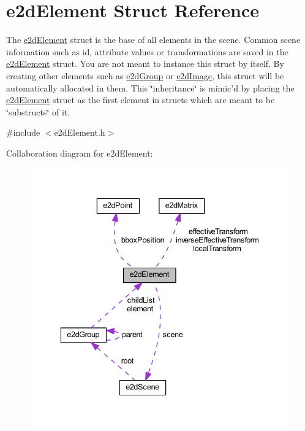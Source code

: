 \hypertarget{structe2d_element}{\section{e2d\-Element Struct Reference}
\label{structe2d_element}
}


The \hyperlink{structe2d_element}{e2d\-Element} struct is the base of all elements in the scene. Common scene information such as id, attribute values or transformations are saved in the \hyperlink{structe2d_element}{e2d\-Element} struct. You are not meant to instance this struct by itself. By creating other elements such as \hyperlink{structe2d_group}{e2d\-Group} or \hyperlink{structe2d_image}{e2d\-Image}, this struct will be automatically allocated in them. This \char`\"{}inheritance\char`\"{} is mimic'd by placing the \hyperlink{structe2d_element}{e2d\-Element} struct as the first element in structs which are meant to be \char`\"{}substructs\char`\"{} of it.  




{\ttfamily \#include $<$e2d\-Element.\-h$>$}



Collaboration diagram for e2d\-Element\-:\nopagebreak
\begin{figure}[H]
\begin{center}
\leavevmode
\includegraphics[width=338pt]{structe2d_element__coll__graph}
\end{center}
\end{figure}
